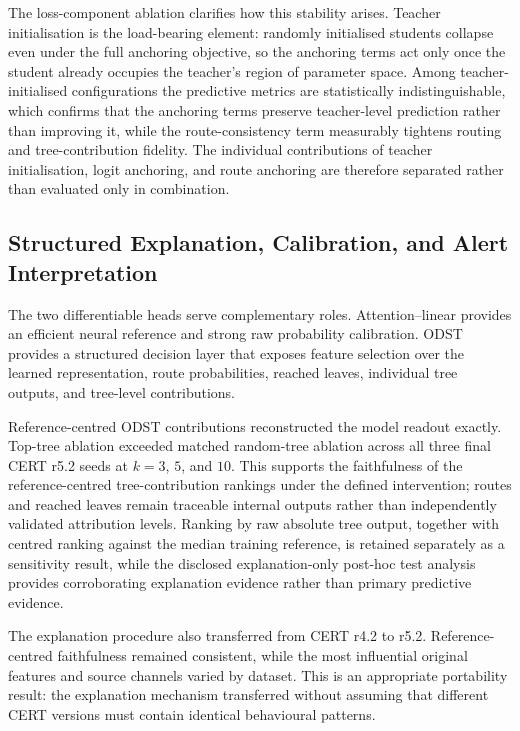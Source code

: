 \smallskip
The loss-component ablation clarifies how this stability arises. Teacher
initialisation is the load-bearing element: randomly initialised students
collapse even under the full anchoring objective, so the anchoring terms act
only once the student already occupies the teacher's region of parameter
space. Among teacher-initialised configurations the predictive metrics are
statistically indistinguishable, which confirms that the anchoring terms
preserve teacher-level prediction rather than improving it, while the
route-consistency term measurably tightens routing and tree-contribution
fidelity. The individual contributions of teacher initialisation, logit
anchoring, and route anchoring are therefore separated rather than evaluated
only in combination.

\subsection{Structured Explanation, Calibration, and Alert Interpretation}
\label{subsec:discussion_explanations}
The two differentiable heads serve complementary roles. Attention--linear
provides an efficient neural reference and strong raw probability
calibration. ODST provides a structured decision layer that exposes feature
selection over the learned representation, route probabilities, reached
leaves, individual tree outputs, and tree-level contributions.

\smallskip
Reference-centred ODST contributions reconstructed the model readout
exactly. Top-tree ablation exceeded matched random-tree ablation across all
three final CERT r5.2 seeds at \(k=3\), \(5\), and \(10\). This supports the
faithfulness of the reference-centred tree-contribution rankings under the
defined intervention; routes and reached leaves remain traceable internal
outputs rather than independently validated attribution levels. Ranking by
raw absolute tree output, together with centred ranking against the median
training reference, is retained separately as a sensitivity result, while
the disclosed explanation-only post-hoc test analysis provides corroborating
explanation evidence rather than primary predictive evidence.

\smallskip
The explanation procedure also transferred from CERT r4.2 to r5.2.
Reference-centred faithfulness remained consistent, while the most
influential original features and source channels varied by dataset. This
is an appropriate portability result: the explanation mechanism transferred
without assuming that different CERT versions must contain identical
behavioural patterns.

